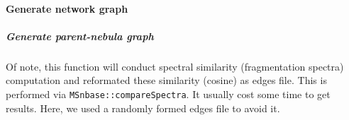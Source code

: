 \documentclass[]{tufte-handout}
\newenvironment{Shaded}{}{}
\newcommand{\CommentTok}[1]{\textcolor[rgb]{0.38,0.63,0.69}{\textit{#1}}}
\newcommand{\DataTypeTok}[1]{\textcolor[rgb]{0.56,0.13,0.00}{#1}}
\newcommand{\DecValTok}[1]{\textcolor[rgb]{0.25,0.63,0.44}{#1}}
\newcommand{\FloatTok}[1]{\textcolor[rgb]{0.25,0.63,0.44}{#1}}
\newcommand{\KeywordTok}[1]{\textcolor[rgb]{0.00,0.44,0.13}{\textbf{#1}}}
\newcommand{\NormalTok}[1]{#1}
\newcommand{\OperatorTok}[1]{\textcolor[rgb]{0.40,0.40,0.40}{#1}}
\newcommand{\StringTok}[1]{\textcolor[rgb]{0.25,0.44,0.63}{#1}}
\begin{document}
\hypertarget{generate-network-graph}{%
\paragraph{Generate network graph}\label{generate-network-graph}}

\hypertarget{generate-parent-nebula-graph}{%
\subparagraph{Generate parent-nebula
graph}\label{generate-parent-nebula-graph}}

Of note, this function will conduct spectral similarity (fragmentation
spectra) computation and reformated these similarity (cosine) as edges
file. This is performed via \texttt{MSnbase::compareSpectra}. It usually
cost some time to get results. Here, we used a randomly formed edges
file to avoid it.

\begin{Shaded}
\end{Shaded}
\end{document}
